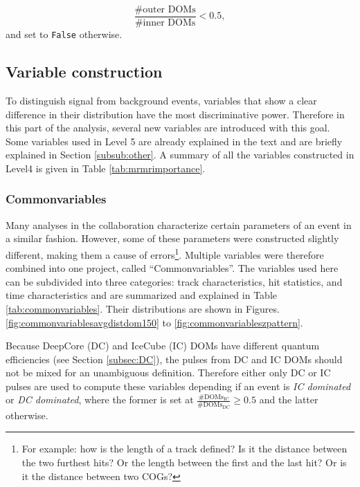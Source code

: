 \begin{equation}
\frac{\# \textrm{outer DOMs}}{\#\textrm{inner DOMs}} < 0.5,
\end{equation}
\noindent and set to \texttt{False} otherwise.

\subsection{Variable construction}
To distinguish signal from background events, variables that show a clear difference in their distribution have the most discriminative power. Therefore in this part of the analysis, several new variables are introduced with this goal. Some variables used in Level 5 are already explained in the text and are briefly explained in Section \ref{subsub:other}. A summary of all the variables constructed in Level4 is given in Table \ref{tab:mrmrimportance}.

\subsubsection{Commonvariables}
\label{subsub:commonvariables}
Many analyses in the collaboration characterize certain parameters of an event in a similar fashion. However, some of these parameters were constructed slightly different, making them a cause of errors\footnote{For example: how is the length of a track defined? Is it the distance between the two furthest hits? Or the length between the first and the last hit? Or is it the distance between two COGs?}. Multiple variables were therefore combined into one project, called ``Commonvariables''. The variables used here can be subdivided into three categories: track characteristics, hit statistics, and time characteristics and are summarized and explained in Table \ref{tab:commonvariables}. Their distributions are shown in Figures. \ref{fig:commonvariablesavgdistdom150} to \ref{fig:commonvariableszpattern}.

Because DeepCore (DC) and IceCube (IC) DOMs have different quantum efficiencies (see Section \ref{subsec:DC}), the pulses from DC and IC DOMs should not be mixed for an unambiguous definition. Therefore either only DC or IC pulses are used to compute these variables depending if an event is \textit{IC dominated} or \textit{DC dominated}, where the former is set at $\frac{\# \textrm{DOMs}_\textrm{IC}}{\# \textrm{DOMs}_\textrm{DC}} \geq 0.5$ and the latter otherwise.

